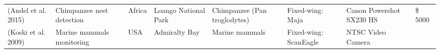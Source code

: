 \documentclass[]{interact}
\theoremstyle{plain}%
\theoremstyle{definition}
\theoremstyle{remark}
\begin{document}
\begin{longtable}[]{@{}llllllll@{}}
\begin{minipage}[t]{0.11\columnwidth}
(Andel et al. 2015)\strut
\end{minipage} & \begin{minipage}[t]{0.18\columnwidth}\raggedright\strut
Chimpanzee nest detection\strut
\end{minipage} & \begin{minipage}[t]{0.03\columnwidth}\raggedright\strut
Africa\strut
\end{minipage} & \begin{minipage}[t]{0.14\columnwidth}\raggedright\strut
Loango National Park\strut
\end{minipage} & \begin{minipage}[t]{0.10\columnwidth}\raggedright\strut
Chimpanzee (Pan troglodytes)\strut
\end{minipage} & \begin{minipage}[t]{0.09\columnwidth}\raggedright\strut
Fixed-wing: Maja\strut
\end{minipage} & \begin{minipage}[t]{0.11\columnwidth}\raggedright\strut
Canon Powershot SX230 HS\strut
\end{minipage} & \begin{minipage}[t]{0.01\columnwidth}\raggedright\strut
\$ 5000\strut
\end{minipage}\tabularnewline
\begin{minipage}[t]{0.11\columnwidth}\raggedright\strut
(Koski et al. 2009)\strut
\end{minipage} & \begin{minipage}[t]{0.18\columnwidth}\raggedright\strut
Marine mammals monitoring\strut
\end{minipage} & \begin{minipage}[t]{0.03\columnwidth}\raggedright\strut
USA\strut
\end{minipage} & \begin{minipage}[t]{0.14\columnwidth}\raggedright\strut
Admiralty Bay\strut
\end{minipage} & \begin{minipage}[t]{0.10\columnwidth}\raggedright\strut
Marine mammals\strut
\end{minipage} & \begin{minipage}[t]{0.09\columnwidth}\raggedright\strut
Fixed-wing: ScanEagle\strut
\end{minipage} & \begin{minipage}[t]{0.11\columnwidth}\raggedright\strut
NTSC Video Camera\strut
\end{minipage} & \begin{minipage}[t]{0.01\columnwidth}\raggedright\strut

\end{minipage}
\end{longtable}
\end{document}
